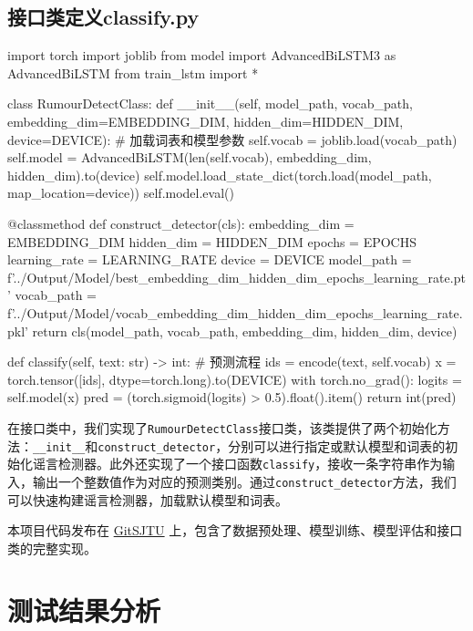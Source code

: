 \subsection{接口类定义classify.py}
\begin{codeblock}[language=Python]
import torch
import joblib
from model import AdvancedBiLSTM3 as AdvancedBiLSTM 
from train_lstm import *

class RumourDetectClass:
    def __init__(self, model_path, vocab_path, embedding_dim=EMBEDDING_DIM, hidden_dim=HIDDEN_DIM, device=DEVICE):
        # 加载词表和模型参数
        self.vocab = joblib.load(vocab_path)
        self.model = AdvancedBiLSTM(len(self.vocab), embedding_dim, hidden_dim).to(device)
        self.model.load_state_dict(torch.load(model_path, map_location=device))
        self.model.eval()

    @classmethod
    def construct_detector(cls):
        embedding_dim = EMBEDDING_DIM
        hidden_dim = HIDDEN_DIM
        epochs = EPOCHS
        learning_rate = LEARNING_RATE
        device = DEVICE
        model_path = f'../Output/Model/best_{embedding_dim}_{hidden_dim}_{epochs}_{learning_rate}.pt'
        vocab_path = f'../Output/Model/vocab_{embedding_dim}_{hidden_dim}_{epochs}_{learning_rate}.pkl'
        return cls(model_path, vocab_path, embedding_dim, hidden_dim, device)

    
    def classify(self, text: str) -> int:
        # 预测流程
        ids = encode(text, self.vocab)
        x = torch.tensor([ids], dtype=torch.long).to(DEVICE)
        with torch.no_grad():
            logits = self.model(x)
            pred = (torch.sigmoid(logits) > 0.5).float().item()
        return int(pred)
\end{codeblock}

在接口类中，我们实现了\verb|RumourDetectClass|接口类，该类提供了两个初始化方法：\verb|__init__|和\verb|construct_detector|，分别可以进行指定或默认模型和词表的初始化谣言检测器。此外还实现了一个接口函数\verb|classify|，接收一条字符串作为输入，输出一个整数值作为对应的预测类别。通过\verb|construct_detector|方法，我们可以快速构建谣言检测器，加载默认模型和词表。

\vspace{1em}
本项目代码发布在 \href{https://git.sjtu.edu.cn/ma_yuezhao/nis4307_rumordetect}{GitSJTU} 上，包含了数据预处理、模型训练、模型评估和接口类的完整实现。

\newpage
\section{测试结果分析}

